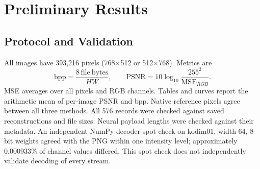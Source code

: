 \documentclass[11pt]{article}
\begin{document}
\section{Preliminary Results}
\subsection{Protocol and Validation}
All images have 393,216 pixels (768$\times$512 or 512$\times$768). Metrics are
\begin{equation}
\mathrm{bpp}=\frac{8\,\mathrm{file\ bytes}}{HW},\qquad
\mathrm{PSNR}=10\log_{10}\frac{255^2}{\mathrm{MSE}_{RGB}}.
\end{equation}
MSE averages over all pixels and RGB channels. Tables and curves report the arithmetic mean of per-image PSNR and bpp. Native reference pixels agree between all three methods. All 576 records were checked against saved reconstructions and file sizes. Neural payload lengths were checked against their metadata. An independent NumPy decoder spot check on kodim01, width 64, 8-bit weights agreed with the PNG within one intensity level; approximately 0.000933\% of channel values differed. This spot check does not independently validate decoding of every stream.
\end{document}

